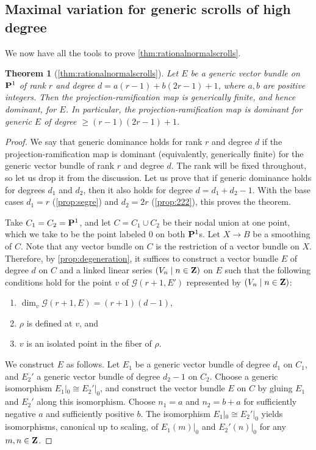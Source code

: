 \documentclass[11pt,reqno]{amsart}
\theoremstyle{plain}
\newtheorem{theorem}{Theorem}[section]
\theoremstyle{definition}
\theoremstyle{remark}
\numberwithin{equation}{section}
\renewcommand{\to}{{\longrightarrow}}
\numberwithin{equation}{section}
\begin{document}
\subsection{Maximal variation for generic scrolls of high degree}\label{sec:llsproof}
We now have all the tools to prove \autoref{thm:rationalnormalscrolls}.
\begin{theorem}[\autoref{thm:rationalnormalscrolls}]
  \label{thm:actualrationalnormalscrolls}
  Let $E$ be a generic vector bundle on $\P^1$ of rank $r$ and degree $d = a(r-1) + b(2r-1)+1$, where $a, b$ are positive integers.
  Then the projection-ramification map is generically finite, and hence dominant, for $E$.
  In particular, the projection-ramification map is dominant for generic $E$ of degree $\geq (r-1)(2r-1)+1$.
\end{theorem}
\begin{proof}
  We say that generic dominance holds for rank $r$ and degree $d$ if the projection-ramification map is dominant (equivalently, generically finite) for the generic vector bundle of rank $r$ and degree $d$.
  The rank will be fixed throughout, so let us drop it from the discussion.
  Let us prove that if generic dominance holds for degrees $d_1$ and $d_2$, then it also holds for degree $d = d_1 + d_2 - 1 $.
  With the base cases $d_1 = r$ (\autoref{prop:segre}) and $d_2 = 2r$ (\autoref{prop:222}), this proves the theorem.

  Take $C_1 = C_2 = \P^1$, and let $C = C_1 \cup C_2$ be their nodal union at one point, which we take to be the point labeled $0$ on both $\P^1$s.
  Let $X \to B$ be a smoothing of $C$.
  Note that any vector bundle on $C$ is the restriction of a vector bundle on $X$.
  Therefore, by \autoref{prop:degeneration}, it suffices to construct a vector bundle $E$ of degree $d$ on $C$ and a linked linear series $(V_n \mid n \in \Z)$ on $E$ such that the following conditions hold for the point $v$ of $\mathcal G (r+1, E')$ represented by $(V_n \mid n \in \Z)$:
  \begin{enumerate}
  \item $\dim_v \mathcal G(r+1, E) = (r+1)(d-1)$,
  \item $\rho$ is defined at $v$, and
  \item $v$ is an isolated point in the fiber of $\rho$.
  \end{enumerate}

  We construct $E$ as follows.
  Let $E_1$ be a generic vector bundle of degree $d_1$ on $C_1$, and $E_2'$ a generic vector bundle of degree $d_2 - 1$ on $C_2$.
  Choose a generic isomorphism $E_1|_0 \cong E_2'|_0$, and construct the vector bundle $E$ on $C$ by gluing $E_1$ and $E_2'$ along this isomorphism.
  Choose $n_1 = a$ and $n_2 = b+a$ for sufficiently negative $a$ and sufficiently positive $b$.
  The isomorphism $E_1 |_0 \cong E_2'|_0$ yields isomorphisms, canonical up to scaling, of $E_1(m)|_0$ and $E_2'(n)|_0$ for any $m, n \in \Z$.


\end{proof}
\end{document}
